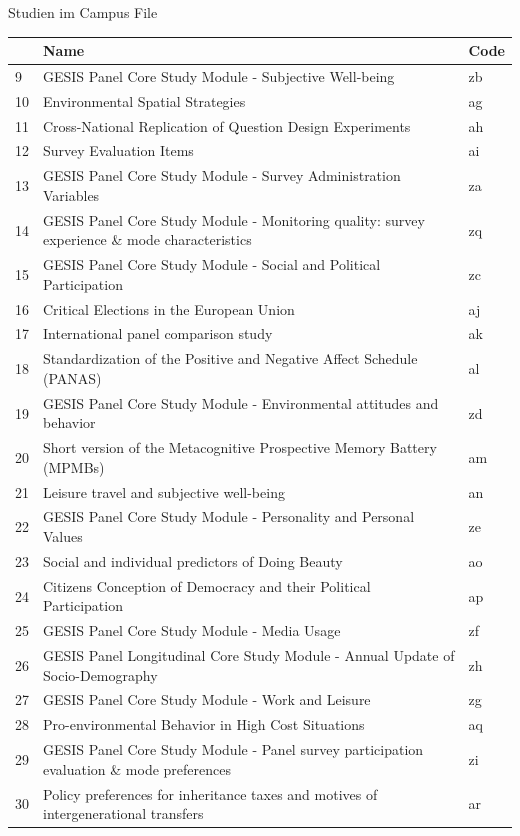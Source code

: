 \documentclass[ignorenonframetext,]{beamer}
\begin{document}
\begin{frame}{Studien im Campus File}

\begin{tabular}{l|l|l}
\hline
  & Name & Code\\
\hline
9 & GESIS Panel Core Study Module - Subjective Well-being & zb\\
\hline
10 & Environmental Spatial Strategies & ag\\
\hline
11 & Cross-National Replication of Question Design Experiments & ah\\
\hline
12 & Survey Evaluation Items & ai\\
\hline
13 & GESIS Panel Core Study Module - Survey Administration Variables & za\\
\hline
14 & GESIS Panel Core Study Module - Monitoring quality: survey experience \& mode characteristics & zq\\
\hline
15 & GESIS Panel Core Study Module - Social and Political Participation & zc\\
\hline
16 & Critical Elections in the European Union & aj\\
\hline
17 & International panel comparison study & ak\\
\hline
18 & Standardization of the Positive and Negative Affect Schedule (PANAS) & al\\
\hline
19 & GESIS Panel Core Study Module - Environmental attitudes and behavior & zd\\
\hline
20 & Short version of the Metacognitive Prospective Memory Battery (MPMBs) & am\\
\hline
21 & Leisure travel and subjective well-being & an\\
\hline
22 & GESIS Panel Core Study Module - Personality and Personal Values & ze\\
\hline
23 & Social and individual predictors of Doing Beauty & ao\\
\hline
24 & Citizens Conception of Democracy and their Political Participation & ap\\
\hline
25 & GESIS Panel Core Study Module - Media Usage & zf\\
\hline
26 & GESIS Panel Longitudinal Core Study Module - Annual Update of Socio-Demography & zh\\
\hline
27 & GESIS Panel Core Study Module - Work and Leisure & zg\\
\hline
28 & Pro-environmental Behavior in High Cost Situations & aq\\
\hline
29 & GESIS Panel Core Study Module - Panel survey participation evaluation \& mode preferences & zi\\
\hline
30 & Policy preferences for inheritance taxes and motives of intergenerational transfers & ar\\
\hline
\end{tabular}

\end{frame}
\end{document}
